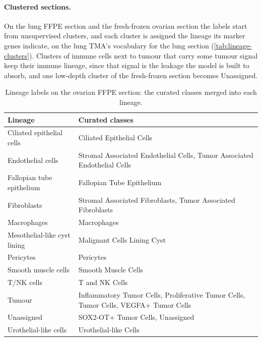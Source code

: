 \paragraph{Clustered sections.}
On the lung FFPE section and the fresh-frozen ovarian section the labels start from unsupervised clusters, and each cluster is assigned the lineage its marker genes indicate, on the lung TMA's vocabulary for the lung section (\cref{tab:lineage-clusters}). Clusters of immune cells next to tumour that carry some tumour signal keep their immune lineage, since that signal is the leakage the model is built to absorb, and one low-depth cluster of the fresh-frozen section becomes Unassigned.

\begin{table}[t]
\centering
\caption{Lineage labels on the ovarian FFPE section: the curated classes merged into each lineage.}
\label{tab:lineage-ovarian}
\small
\begin{tabular}{@{}>{\raggedright\arraybackslash}p{}>{\raggedright\arraybackslash}p{}@{}}
\toprule
Lineage & Curated classes \\
\midrule
Ciliated epithelial cells & Ciliated Epithelial Cells \\
Endothelial cells & Stromal Associated Endothelial Cells, Tumor Associated Endothelial Cells \\
Fallopian tube epithelium & Fallopian Tube Epithelium \\
Fibroblasts & Stromal Associated Fibroblasts, Tumor Associated Fibroblasts \\
Macrophages & Macrophages \\
Mesothelial-like cyst lining & Malignant Cells Lining Cyst \\
Pericytes & Pericytes \\
Smooth muscle cells & Smooth Muscle Cells \\
T/NK cells & T and NK Cells \\
Tumour & Inflammatory Tumor Cells, Proliferative Tumor Cells, Tumor Cells, VEGFA+ Tumor Cells \\
Unassigned & SOX2-OT+ Tumor Cells, Unassigned \\
Urothelial-like cells & Urothelial-like Cells \\
\bottomrule
\end{tabular}
\end{table}

